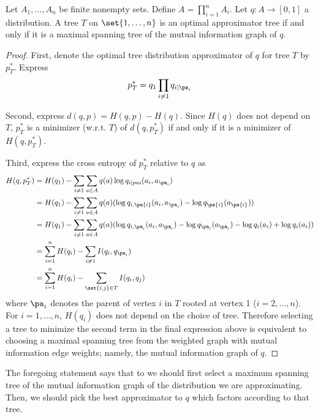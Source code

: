 \begin{proposition}

\label{prop:optimaltreeapproximators}Let $A_1, \dots , A_n$ be finite nonempty sets.
Define $A = \prod_{i = 1}^{n} A_i$.
Let $q: A \to [0, 1]$ a distribution.
A tree $T$ on $\set{1, \dots , n}$ is an optimal approximator tree if and only if it is a maximal spanning tree of the mutual information graph of $q$.
\end{proposition}
\begin{proof}First, denote the optimal tree distribution approximator of $q$ for tree $T$ by $p^*_T$.
Express
    \[
p^*_T = q_1 \prod_{i \neq 1} q_{i \mid \pa_i}
    \]

Second, express $d(q, p) = H(q, p) - H(q)$.
Since $H(q)$ does not depend on $T$, $p^*_T$ is a minimizer (w.r.t. $T$) of $d(q, p^*_T)$ if and only if it is a minimizer of $H(q, p^*_T)$.

Third, express the cross entropy of $p^*_T$ relative to $q$ as
    \[
\begin{aligned}
H(q, p^*_T) &= H(q_1) - \sum_{i \neq 1} \sum_{a \in A} q(a)\log q_{i \mid pa{i}}(a_i, a_{\pa_i}) \\
&= H(q_1) - \sum_{i \neq 1} \sum_{a \in A} q(a)(\log q_{i,\pa{i}}(a_i, a_{\pa_i}) - \log q_{\pa{i}}(a_{\pa{i}})) \\
&= H(q_1) - \sum_{i \neq 1} \sum_{a \in A} q(a)(\log q_{i,\pa_i}(a_i, a_{\pa_i}) - \log q_{\pa_i}(a_{\pa_i}) - \log q_i(a_i) + \log q_{i}(a_i)) \\
&= \sum_{i = 1}^{n} H(q_i) - \sum_{i \neq 1} I(q_i, q_{\pa_i}) \\
&= \sum_{i = 1}^{n} H(q_i) - \sum_{\set{i,j} \in T} I(q_i, q_{j}) \\
\end{aligned}
    \]
where $\pa_i$ denotes the parent of vertex $i$ in $T$ rooted at vertex 1 ($i = 2, \dots , n$).
For $i = 1, \dots , n$, $H(q_i)$ does not depend on the choice of tree.
Therefore selecting a tree to minimize the second term in the final expression above is equivalent to choosing a maximal spanning tree from the weighted graph with mutual information edge weights; namely, the mutual information graph of $q$.
\end{proof}
The foregoing statement says that to we should first select a maximum spanning tree of the mutual information graph of the distribution we are approximating.
Then, we should pick the best approximator to $q$ which factors according to that tree.
